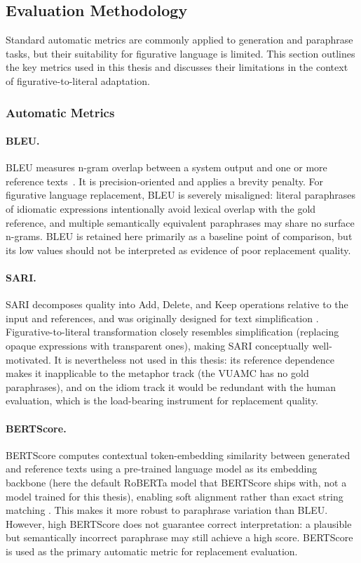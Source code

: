 \subsection{Evaluation Methodology}
\label{sec:eval-methodology}

Standard automatic metrics are commonly applied to generation and paraphrase tasks, but their suitability for figurative language is limited. This section outlines the key metrics used in this thesis and discusses their limitations in the context of figurative-to-literal adaptation.

\subsubsection{Automatic Metrics}

\paragraph{BLEU.} BLEU measures n-gram overlap between a system output and one or more reference texts~\cite{papineni2002bleu}. It is precision-oriented and applies a brevity penalty. For figurative language replacement, BLEU is severely misaligned: literal paraphrases of idiomatic expressions intentionally avoid lexical overlap with the gold reference, and multiple semantically equivalent paraphrases may share no surface n-grams. BLEU is retained here primarily as a baseline point of comparison, but its low values should not be interpreted as evidence of poor replacement quality.

\paragraph{SARI.} SARI decomposes quality into Add, Delete, and Keep operations relative to the input and references, and was originally designed for text simplification \cite{xu2016sari}. Figurative-to-literal transformation closely resembles simplification (replacing opaque expressions with transparent ones), making SARI conceptually well-motivated. It is nevertheless not used in this thesis: its reference dependence makes it inapplicable to the metaphor track (the VUAMC has no gold paraphrases), and on the idiom track it would be redundant with the human evaluation, which is the load-bearing instrument for replacement quality.

\paragraph{BERTScore.} BERTScore computes contextual token-embedding similarity between generated and reference texts using a pre-trained language model as its embedding backbone (here the default RoBERTa model that BERTScore ships with, not a model trained for this thesis), enabling soft alignment rather than exact string matching \cite{zhang2020bertscore}. This makes it more robust to paraphrase variation than BLEU. However, high BERTScore does not guarantee correct interpretation: a plausible but semantically incorrect paraphrase may still achieve a high score. BERTScore is used as the primary automatic metric for replacement evaluation.

